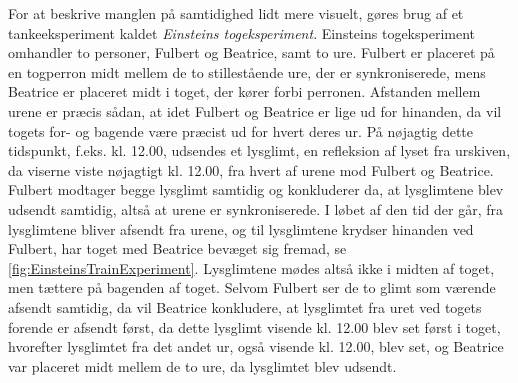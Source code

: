 For at beskrive manglen på samtidighed lidt mere visuelt, gøres brug af et tankeeksperiment kaldet \emph{Einsteins togeksperiment}. Einsteins togeksperiment omhandler to personer, Fulbert og Beatrice, samt to ure. Fulbert er placeret på en togperron midt mellem de to stillestående ure, der er synkroniserede, mens Beatrice er placeret midt i toget, der kører forbi perronen. Afstanden mellem urene er præcis sådan, at idet Fulbert og Beatrice er lige ud for hinanden, da vil togets for- og bagende være præcist ud for hvert deres ur. På nøjagtig dette tidspunkt, f.eks. kl. 12.00, udsendes et lysglimt, en refleksion af lyset fra urskiven, da viserne viste nøjagtigt kl. 12.00, fra hvert af urene mod Fulbert og Beatrice. Fulbert modtager begge lysglimt samtidig og konkluderer da, at lysglimtene blev udsendt samtidig, altså at urene er synkroniserede. I løbet af den tid der går, fra lysglimtene bliver afsendt fra urene, og til lysglimtene krydser hinanden ved Fulbert, har toget med Beatrice bevæget sig fremad, se \cref{fig:EinsteinsTrainExperiment}. Lysglimtene mødes altså ikke i midten af toget, men tættere på bagenden af toget. Selvom Fulbert ser de to glimt som værende afsendt samtidig, da vil Beatrice konkludere, at lysglimtet fra uret ved togets forende er afsendt først, da dette lysglimt visende kl. 12.00 blev set først i toget, hvorefter lysglimtet fra det andet ur, også visende kl. 12.00, blev set, og Beatrice var placeret midt mellem de to ure, da lysglimtet blev udsendt.
%
